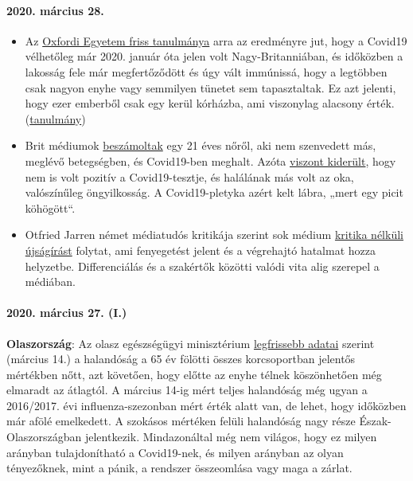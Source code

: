 \hypertarget{2020-muxe1rcius-28}{%
\paragraph{2020. március 28.}\label{2020-muxe1rcius-28}}

\begin{itemize}
\tightlist
\item
  Az
  \href{https://news.yahoo.com/oxford-study-suggests-millions-people-221100162.html}{Oxfordi
  Egyetem friss tanulmánya} arra az eredményre jut, hogy a Covid19
  vélhetőleg már 2020. január óta jelen volt Nagy-Britanniában, és
  időközben a lakosság fele már megfertőződött és úgy vált immúnissá,
  hogy a legtöbben csak nagyon enyhe vagy semmilyen tünetet sem
  tapasztaltak. Ez azt jelenti, hogy ezer emberből csak egy kerül
  kórházba, ami viszonylag alacsony érték.
  (\href{https://www.medrxiv.org/content/10.1101/2020.03.24.20042291v1}{tanulmány})
\item
  Brit médiumok
  \href{https://www.bbc.com/news/uk-england-beds-bucks-herts-52041709}{beszámoltak}
  egy 21 éves nőről, aki nem szenvedett más, meglévő betegségben, és
  Covid19-ben meghalt. Azóta
  \href{https://archive.is/20200329015127/https://www.theguardian.com/world/2020/mar/27/chloe-middleton-death-21-year-old-not-recorded-nhs-covid-19-related}{viszont
  kiderült}, hogy nem is volt pozitív a Covid19-tesztje, és halálának
  más volt az oka, valószínűleg öngyilkosság. A Covid19-pletyka azért
  kelt lábra, „mert egy picit köhögött``.
\item
  Otfried Jarren német médiatudós kritikája szerint sok médium
  \href{https://www.deutschlandfunk.de/covid-19-scharfe-kritik-an-ard-und-zdf-wegen.2849.de.html?drn:news_id=1114517}{kritika
  nélküli újságírást} folytat, ami fenyegetést jelent és a végrehajtó
  hatalmat hozza helyzetbe. Differenciálás és a szakértők közötti valódi
  vita alig szerepel a médiában.
\end{itemize}

\hypertarget{2020-muxe1rcius-27-i}{%
\paragraph{2020. március 27. (I.)}\label{2020-muxe1rcius-27-i}}

\textbf{Olaszország}: Az olasz egészségügyi minisztérium
\href{http://www.salute.gov.it/portale/caldo/SISMG_sintesi_ULTIMO.pdf}{legfrissebb
adatai} szerint (március 14.) a halandóság a 65 év fölötti összes
korcsoportban jelentős mértékben nőtt, azt követően, hogy előtte az
enyhe télnek köszönhetően még elmaradt az átlagtól. A március 14-ig mért
teljes halandóság még ugyan a 2016/2017. évi influenza-szezonban mért
érték alatt van, de lehet, hogy időközben már afölé emelkedett. A
szokásos mértéken felüli halandóság nagy része Észak-Olaszországban
jelentkezik. Mindazonáltal még nem világos, hogy ez milyen arányban
tulajdonítható a Covid19-nek, és milyen arányban az olyan tényezőknek,
mint a pánik, a rendszer összeomlása vagy maga a zárlat.

